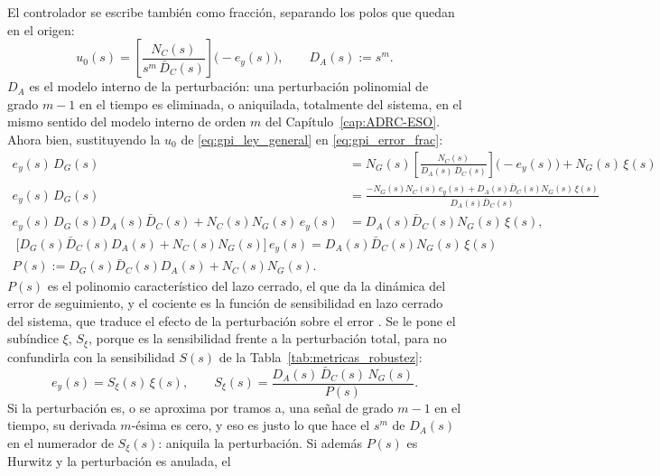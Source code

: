 El controlador se escribe también como fracción, separando los polos que quedan en el origen:
\begin{equation}
u_0(s) = \left[\frac{N_C(s)}{s^{m}\,\bar{D}_C(s)}\right]\bigl(-e_y(s)\bigr),
\qquad D_A(s) := s^{m} .
\label{eq:gpi_ley_general}
\end{equation}
$D_A$ es el modelo interno de la perturbación: una perturbación polinomial de
grado $m - 1$ en el tiempo es eliminada, o aniquilada, totalmente del sistema, en el mismo sentido
del modelo interno de orden $m$ del Capítulo~\ref{cap:ADRC-ESO}. Ahora bien,
sustituyendo la $u_0$ de \eqref{eq:gpi_ley_general} en \eqref{eq:gpi_error_frac}:
\begin{align}
e_y(s)\,D_G(s) &= N_G(s)\left[\frac{N_C(s)}{D_A(s)\,\bar{D}_C(s)}\right]\bigl(-e_y(s)\bigr) + N_G(s)\,\xi(s) \nonumber\\[4pt]
e_y(s)\,D_G(s) &= \frac{-N_G(s) N_C(s)\,e_y(s) + D_A(s) \bar{D}_C(s) N_G(s)\,\xi(s)}{D_A(s) \bar{D}_C(s)} \nonumber\\[4pt]
e_y(s)\,D_G(s) D_A(s) \bar{D}_C(s) + N_C(s) N_G(s)\,e_y(s) &= D_A(s) \bar{D}_C(s) N_G(s)\,\xi(s) ,
\end{align}
\begin{equation}
\begin{gathered}
\boxed{\;\bigl[D_G(s) \bar{D}_C(s) D_A(s) + N_C(s) N_G(s)\bigr]\,e_y(s) = D_A(s) \bar{D}_C(s) N_G(s)\,\xi(s)\;}\\[4pt]
P(s) := D_G(s) \bar{D}_C(s) D_A(s) + N_C(s) N_G(s) .
\end{gathered}
\label{eq:gpi_lazo_general}
\end{equation}
$P(s)$ es el polinomio característico del lazo cerrado, el que da la dinámica del
error de seguimiento, y el cociente es la
función de sensibilidad en lazo cerrado del sistema, que traduce el efecto de
la perturbación sobre el error \cite{sira2017adrc}. Se le pone el
subíndice $\xi$, $S_{\xi}$, porque es la sensibilidad frente a la perturbación
total, para no confundirla con la sensibilidad $S(s)$ de la Tabla~\ref{tab:metricas_robustez}:
\begin{equation}
e_y(s) = S_{\xi}(s)\,\xi(s), \qquad
S_{\xi}(s) = \frac{D_A(s)\,\bar{D}_C(s)\,N_G(s)}{P(s)} .
\label{eq:gpi_sensibilidad}
\end{equation}
Si la perturbación es, o se aproxima por tramos a, una señal de grado $m - 1$ en el tiempo, su
derivada $m$-ésima es cero, y eso es justo lo que hace el $s^{m}$ de $D_A(s)$ en el numerador de
$S_{\xi}(s)$: aniquila la perturbación. Si además $P(s)$ es Hurwitz y la perturbación es anulada, el
